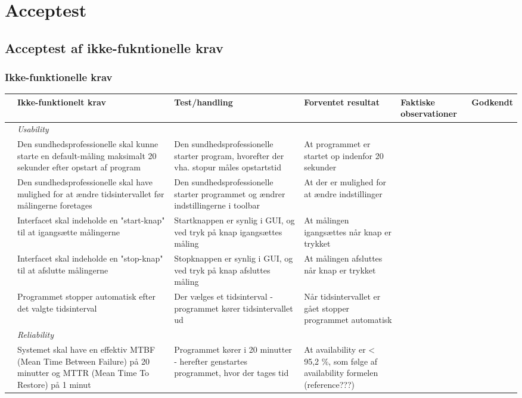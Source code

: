 \chapter{Acceptest}

\section{Acceptest af ikke-fukntionelle krav}

\subsection{Ikke-funktionelle krav}

\begin{longtabu} to 
	& Ikke-funktionelt krav & Test/handling & Forventet resultat & Faktiske observationer & Godkendt
	\\[-1ex] \midrule
	&  \textit{Usability} &  &  & & \\ \midrule
	& Den sundhedsprofessionelle skal kunne starte en default-måling maksimalt 20 sekunder efter opstart af program & Den sundhedsprofessionelle starter program, hvorefter der vha. stopur måles opstartstid & At programmet er startet op indenfor 20 sekunder & & \\ \midrule
	& Den sundhedsprofessionelle skal have mulighed for at ændre tidsintervallet før målingerne foretages & Den sundhedsprofessionelle starter programmet og ændrer indstillingerne i toolbar & At der er mulighed for at ændre indstillinger & & \\ \midrule
	& Interfacet skal indeholde en "start-knap" til at igangsætte målingerne & Startknappen er synlig i GUI, og ved tryk på knap igangsættes måling & At målingen igangsættes når knap er trykket & & \\ \midrule
	& Interfacet skal indeholde en "stop-knap" til at afslutte målingerne & Stopknappen er synlig i GUI, og ved tryk på knap afsluttes måling & At målingen afsluttes når knap er trykket & & \\ \midrule
	& Programmet stopper automatisk efter det valgte tidsinterval & Der vælges et tidsinterval - programmet kører tidsintervallet ud & Når tidsintervallet er gået stopper programmet automatisk & & \\ \midrule
	& \textit{Reliability} & & & & \\ \midrule
	& Systemet skal have en effektiv MTBF (Mean Time Between Failure) på 20 minutter og MTTR (Mean Time To Restore) på 1 minut & Programmet kører i 20 minutter - herefter genstartes programmet, hvor der tages tid & At availability er < 95,2 \%, som følge af availability formelen (reference???) & & \\ \midrule

\end{longtabu}
